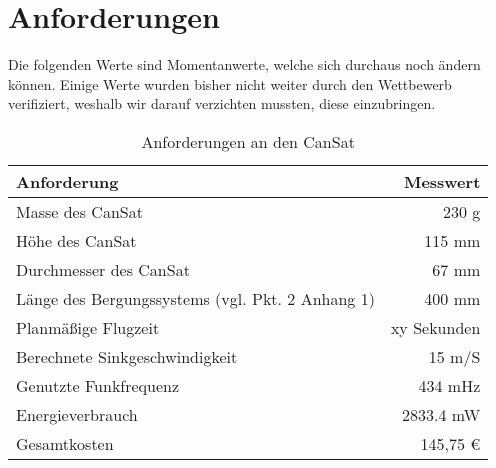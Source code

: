 \section{Anforderungen}
Die folgenden Werte sind Momentanwerte, welche sich durchaus noch ändern können. Einige Werte wurden bisher nicht weiter durch den Wettbewerb verifiziert, weshalb wir darauf verzichten mussten, diese einzubringen.
\begin{table}[htbp]
  \centering
    \begin{tabular}{l|r}
    \toprule
    \textbf{Anforderung} & \textbf{Messwert}  \\
    \midrule
    Masse des CanSat  & 230 g \\
    Höhe des CanSat	  & 115 mm\\
    Durchmesser des CanSat & 67 mm\\
	Länge des Bergungssystems (vgl. Pkt. 2 Anhang 1)  & 400 mm \\
	Planmäßige Flugzeit  & xy Sekunden \\
    Berechnete Sinkgeschwindigkeit  & 15 m/S \\
    Genutzte Funkfrequenz & 434 mHz \\
    Energieverbrauch & 2833.4 mW \\
    Gesamtkosten & 145,75 \euro \\
    \bottomrule
    \end{tabular}%
    \caption{Anforderungen an den CanSat}
  \label{tab:anforderungen}%
\end{table}%